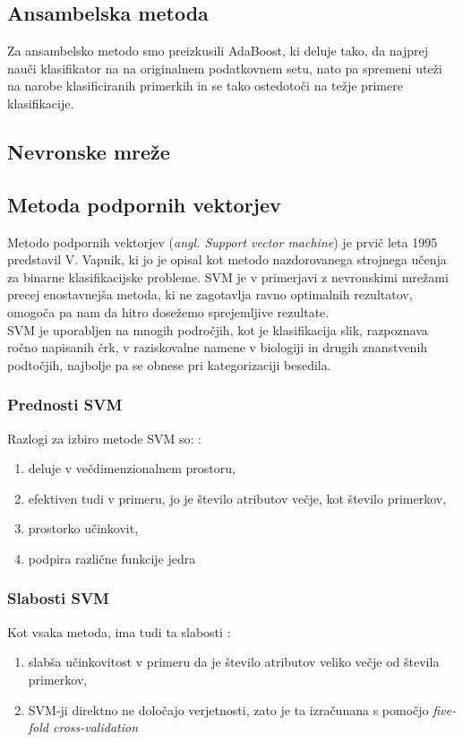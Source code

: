 \documentclass{acm_proc_article-sp}
\begin{document}
\subsection{Ansambelska metoda}
Za ansambelsko metodo smo preizkusili AdaBoost, ki deluje tako, da najprej nauči klasifikator na na originalnem podatkovnem setu, nato pa spremeni uteži na narobe klasificiranih primerkih in se tako ostedotoči na težje primere klasifikacije. \cite{SciAda}


\subsection{Nevronske mreže}


\subsection{Metoda podpornih vektorjev}
Metodo podpornih  vektorjev (\textit{angl. Support vector machine}) je prvič leta 1995 predstavil V. Vapnik\cite{Vapnik}, ki jo je opisal kot metodo nazdorovanega strojnega učenja za binarne klasifikacijske probleme. SVM je v primerjavi z nevronskimi mrežami precej enostavnejša metoda, ki ne zagotavlja ravno optimalnih rezultatov, omogoča pa nam da hitro dosežemo sprejemljive rezultate\cite{Hsu}.\\
SVM je uporabljen na mnogih področjih, kot je klasifikacija slik, razpoznava ročno napisanih črk, v raziskovalne namene v biologiji in drugih znanstvenih podtočjih, najbolje pa se obnese pri kategorizaciji besedila\cite{Wiki_svm}.\\
\subsubsection{Prednosti SVM}
Razlogi za izbiro metode SVM so: \cite{SciDev}:
\begin{enumerate}
\item{deluje v večdimenzionalnem prostoru,}
\item{efektiven tudi v primeru, jo je število atributov večje, kot število primerkov,}
\item{prostorko učinkovit,}
\item{podpira različne funkcije jedra}
\end{enumerate}

\subsubsection{Slabosti SVM}
Kot vsaka metoda, ima tudi ta slabosti \cite{SciDev}:
\begin{enumerate}
\item{slabša učinkovitost v primeru da je število atributov veliko večje od števila primerkov,}
\item{SVM-ji direktno ne določajo verjetnosti, zato je ta izračunana s pomočjo \textit{five-fold cross-validation}}
\end{enumerate}
\end{document}
